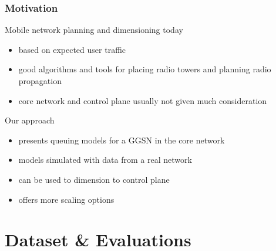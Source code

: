 \documentclass{beamer}
\begin{document}
\begin{frame}
    \frametitle{Motivation}



	Mobile network planning and dimensioning today
    \begin{itemize}
    	\item based on expected user traffic
		\item good algorithms and tools for placing radio towers and planning radio propagation
		\item core network and control plane usually not given much consideration
	\end{itemize}

	Our approach
	\begin{itemize}
		\item presents queuing models for a GGSN in the core network
		\item models simulated with data from a real network
		\item can be used to dimension to control plane
		\item offers more scaling options
	\end{itemize}

\end{frame}

\section{Dataset \& Evaluations}
\end{document}
